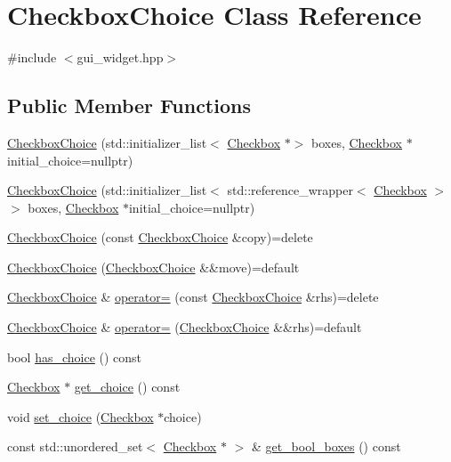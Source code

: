 \hypertarget{class_checkbox_choice}{}\section{Checkbox\+Choice Class Reference}
\label{class_checkbox_choice}


{\ttfamily \#include $<$gui\+\_\+widget.\+hpp$>$}

\subsection*{Public Member Functions}
\begin{DoxyCompactItemize}
\item 
\mbox{\hyperlink{class_checkbox_choice_aef739358c920959f7158498af135d261}{Checkbox\+Choice}} (std\+::initializer\+\_\+list$<$ \mbox{\hyperlink{class_checkbox}{Checkbox}} $\ast$$>$ boxes, \mbox{\hyperlink{class_checkbox}{Checkbox}} $\ast$initial\+\_\+choice=nullptr)
\item 
\mbox{\hyperlink{class_checkbox_choice_acbbc8db19fa53fc73c913780e0fb2b89}{Checkbox\+Choice}} (std\+::initializer\+\_\+list$<$ std\+::reference\+\_\+wrapper$<$ \mbox{\hyperlink{class_checkbox}{Checkbox}} $>$$>$ boxes, \mbox{\hyperlink{class_checkbox}{Checkbox}} $\ast$initial\+\_\+choice=nullptr)
\item 
\mbox{\hyperlink{class_checkbox_choice_a1434699c2e3295b5037010403cbab6c9}{Checkbox\+Choice}} (const \mbox{\hyperlink{class_checkbox_choice}{Checkbox\+Choice}} \&copy)=delete
\item 
\mbox{\hyperlink{class_checkbox_choice_a907edd806c8e5a7ef45fdc64c013f4eb}{Checkbox\+Choice}} (\mbox{\hyperlink{class_checkbox_choice}{Checkbox\+Choice}} \&\&move)=default
\item 
\mbox{\hyperlink{class_checkbox_choice}{Checkbox\+Choice}} \& \mbox{\hyperlink{class_checkbox_choice_a8e99359a312be66fed6837c768e9e184}{operator=}} (const \mbox{\hyperlink{class_checkbox_choice}{Checkbox\+Choice}} \&rhs)=delete
\item 
\mbox{\hyperlink{class_checkbox_choice}{Checkbox\+Choice}} \& \mbox{\hyperlink{class_checkbox_choice_a8afcd170a63e030912620c18b0527fe8}{operator=}} (\mbox{\hyperlink{class_checkbox_choice}{Checkbox\+Choice}} \&\&rhs)=default
\item 
bool \mbox{\hyperlink{class_checkbox_choice_a6fd60881829607567eac28ba82c6a5b4}{has\+\_\+choice}} () const
\item 
\mbox{\hyperlink{class_checkbox}{Checkbox}} $\ast$ \mbox{\hyperlink{class_checkbox_choice_a61b7eedbf1aa28060ac22b47039b060a}{get\+\_\+choice}} () const
\item 
void \mbox{\hyperlink{class_checkbox_choice_a02298a96989fb9c74de92e3094a51466}{set\+\_\+choice}} (\mbox{\hyperlink{class_checkbox}{Checkbox}} $\ast$choice)
\item 
const std\+::unordered\+\_\+set$<$ \mbox{\hyperlink{class_checkbox}{Checkbox}} $\ast$ $>$ \& \mbox{\hyperlink{class_checkbox_choice_a76ea2985a33d1b48b637d049f55c2443}{get\+\_\+bool\+\_\+boxes}} () const
\end{DoxyCompactItemize}



